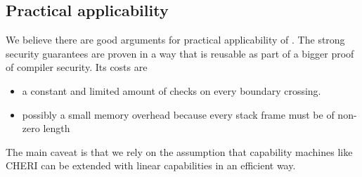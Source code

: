 \documentclass[acmsmall,review,showframe]{acmart}\settopmatter{printfolios=true,printccs=false,printacmref=false}
\newcommand{\trgcm}{\textsc{LCM}}
\newcommand{\srccm}{\textsc{oLCM}}
\begin{document}



\subsection{Practical applicability}
We believe there are good arguments for practical applicability of \stktokens{}.
The strong security guarantees are proven in a way that is reusable as part of a bigger proof of compiler security.
Its costs are
\begin{itemize}
\item a constant and limited amount of checks on every boundary crossing.
\item possibly a small memory overhead because every stack frame must be of non-zero length
\end{itemize}
The main caveat is that we rely on the assumption that capability machines like CHERI can be extended with linear capabilities in an efficient way.
\end{document}
